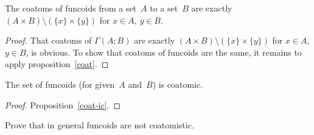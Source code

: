 \begin{thm}
The coatoms of funcoids from a set~$A$ to a set~$B$ are exactly
$(A\times B)\setminus(\{x\}\times\{y\})$ for $x\in A$, $y\in B$.\end{thm}
\begin{proof}
That coatoms of $\Gamma(A;B)$
are exactly $(A\times B)\setminus(\{x\}\times\{y\})$ for $x\in A$,
$y\in B$, is obvious. To show that coatoms of funcoids are the same,
it remains to apply proposition~\ref{coat}.\end{proof}
\begin{thm}
The set of funcoids (for given~$A$ and~$B$) is coatomic.\end{thm}
\begin{proof}
Proposition~\ref{coat-ic}.\end{proof}
\begin{xca}
Prove that in general funcoids are not coatomistic.\end{xca}

